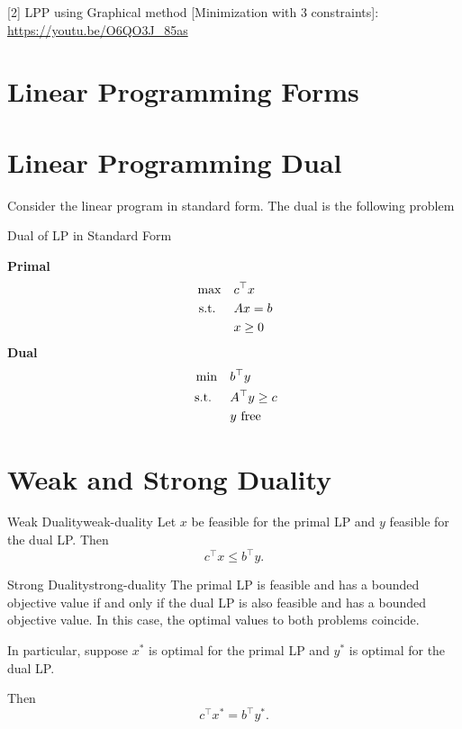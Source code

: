 [2] LPP using Graphical method [Minimization with 3 constraints]: \url{https://youtu.be/O6QO3J_85as}


\section{Linear Programming Forms}

\section{Linear Programming Dual}
Consider the linear program in standard form.  The dual is the following problem

\begin{general}{Dual of LP in Standard Form}{\polynomial}


\begin{multicols}{2}
\textbf{Primal}
\begin{equation*}
\begin{split}
\max \quad & c^\top x\\
\mbox{ s.t. } \quad & A x = b\\
& x \geq 0
\end{split}
\end{equation*}
\break
\textbf{Dual}
\begin{equation}
\begin{split}
\min \quad & b^\top y\\
\mbox{ s.t. } \quad & A^\top y \geq c\\
& y \mbox{ free }
\end{split}
\end{equation}
\end{multicols}
\end{general}

\section{Weak and Strong Duality}
\begin{theorem}{Weak Duality}{weak-duality}
Let $x$ be feasible for the primal LP and $y$ feasible for the dual LP.  Then 
\begin{equation}
c^\top x \leq b^\top y.
\end{equation}
\end{theorem}

\begin{theorem}{Strong Duality}{strong-duality}
The primal LP is feasible and has a bounded objective value if and only if the dual LP is also feasible and has a bounded objective value.  In this case, the optimal values to both problems coincide.

In particular, suppose $x^*$ is optimal for the primal LP and $y^*$ is optimal for the dual LP.

Then 
\begin{equation}
c^\top x^* = b^\top y^*.
\end{equation}
\end{theorem}


